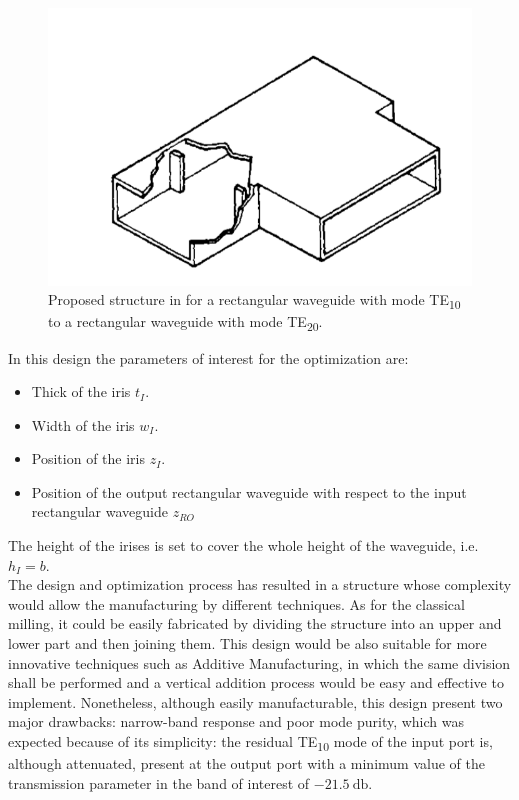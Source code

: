 \documentclass[english,twoside]{article}
\begin{document}
		\begin{figure}[H]
			\centering
			\includegraphics[width=.5\textwidth]{figures/book_wr2wrte20}
			\caption{Proposed structure in \cite{montgomery} for a rectangular waveguide with mode TE\textsubscript{10} to a rectangular waveguide with mode TE\textsubscript{20}.}
			\label{fig:book_wr2wrte20}
		\end{figure}
	
		In this design the parameters of interest for the optimization are:
		\begin{itemize}
			\item Thick of the iris $t_I$.
			\item Width of the iris $w_I$.
			\item Position of the iris $z_I$.
			\item Position of the output rectangular waveguide with respect to the input rectangular waveguide $z_{RO}$
		\end{itemize}
    
    The height of the irises is set to cover the whole height of the waveguide, i.e. $h_I=b$.\\
    
    The design and optimization process has resulted in a structure whose complexity would allow the manufacturing by different techniques. As for the classical milling, it could be easily fabricated by dividing the structure into an upper and lower part and then joining them. This design would be also suitable for more innovative techniques such as Additive Manufacturing, in which the same division shall be performed and a vertical addition process would be easy and effective to implement. Nonetheless, although easily manufacturable, this design present two major drawbacks: narrow-band response and poor mode purity, which was expected because of its simplicity: the residual \ac{TE}\textsubscript{10} mode of the input port is, although attenuated, present at the output port with a minimum value of the transmission parameter in the band of interest of $\SI{-21.5}{\decibel}$.\\
	
\end{document}
